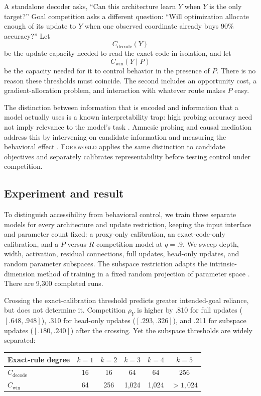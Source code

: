 \documentclass[11pt,a4paper]{article}
\newcommand{\rhoY}{\rho_Y}
\newcommand{\Forkworld}{\textsc{Forkworld}}
\begin{document}
A standalone decoder asks, ``Can this architecture learn $Y$ when $Y$ is the only target?'' Goal competition asks a different question: ``Will optimization allocate enough of its update to $Y$ when one observed coordinate already buys 90\% accuracy?'' Let
\[
C_{\mathrm{decode}}(Y)
\]
be the update capacity needed to read the exact code in isolation, and let
\[
C_{\mathrm{win}}(Y\mid P)
\]
be the capacity needed for it to control behavior in the presence of $P$. There is no reason these thresholds must coincide. The second includes an opportunity cost, a gradient-allocation problem, and interaction with whatever route makes $P$ easy.

The distinction between information that is encoded and information that a model actually uses is a known interpretability trap: high probing accuracy need not imply relevance to the model's task \citep{ravichander2021probing}. Amnesic probing and causal mediation address this by intervening on candidate information and measuring the behavioral effect \citep{elazar2021amnesic,vig2020causal}. \Forkworld{} applies the same distinction to candidate objectives and separately calibrates representability before testing control under competition.

\subsection*{Experiment and result}

To distinguish accessibility from behavioral control, we train three separate models for every architecture and update restriction, keeping the input interface and parameter count fixed: a proxy-only calibration, an exact-code-only calibration, and a $P$-versus-$R$ competition model at $q=.9$. We sweep depth, width, activation, residual connections, full updates, head-only updates, and random parameter subspaces. The subspace restriction adapts the intrinsic-dimension method of training in a fixed random projection of parameter space \citep{li2018intrinsic}. There are 9,300 completed runs.

Crossing the exact-calibration threshold predicts greater intended-goal reliance, but does not determine it. Competition $\rhoY$ is higher by .810 for full updates ($[.648,.948]$), .310 for head-only updates ($[.293,.326]$), and .211 for subspace updates ($[.180,.240]$) after the crossing. Yet the subspace thresholds are widely separated:

\begin{center}
\begin{tabular}{lccccc}
\toprule
Exact-rule degree & $k=1$ & $k=2$ & $k=3$ & $k=4$ & $k=5$ \\
\midrule
$C_{\mathrm{decode}}$ & 16 & 16 & 64 & 64 & 256 \\
$C_{\mathrm{win}}$ & 64 & 256 & 1,024 & 1,024 & $>1{,}024$ \\
\bottomrule
\end{tabular}
\end{center}
\end{document}
